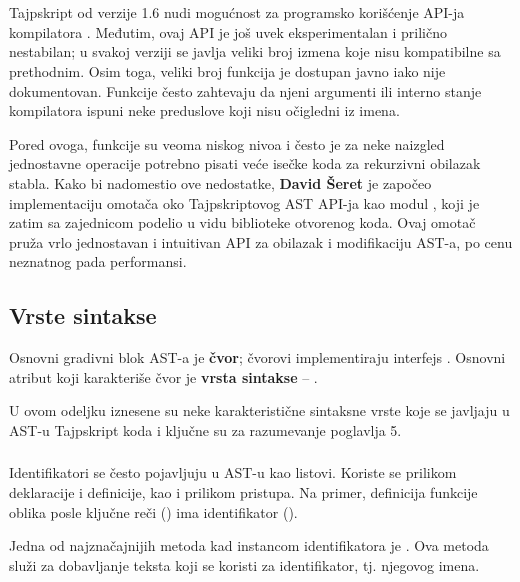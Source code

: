 \section{}
\label{sec:ts-simple-ast}

Tajpskript od verzije 1.6 nudi mogućnost za programsko korišćenje API-ja kompilatora \cite{gh:ms:ts:wiki:using-the-compiler-api}.
Međutim, ovaj API je još uvek eksperimentalan i prilično nestabilan; u svakoj verziji se javlja veliki broj izmena koje nisu kompatibilne sa prethodnim.
Osim toga, veliki broj funkcija je dostupan javno iako nije dokumentovan.
Funkcije često zahtevaju da njeni argumenti ili interno stanje kompilatora ispuni neke preduslove koji nisu očigledni iz imena.

Pored ovoga, funkcije su veoma niskog nivoa i često je za neke naizgled jednostavne operacije potrebno pisati veće isečke koda za rekurzivni obilazak stabla.
Kako bi nadomestio ove nedostatke, \textbf{David Šeret} je započeo implementaciju omotača oko Tajpskriptovog AST API-ja kao modul , koji je zatim sa zajednicom podelio u vidu biblioteke otvorenog koda.
Ovaj omotač pruža vrlo jednostavan i intuitivan API za obilazak i modifikaciju AST-a, po cenu neznatnog pada performansi.

\subsection{Vrste sintakse}

Osnovni gradivni blok AST-a je \textbf{čvor}; čvorovi implementiraju interfejs .
Osnovni atribut koji karakteriše čvor je \textbf{vrsta sintakse} -- .

U ovom odeljku iznesene su neke karakteristične sintaksne vrste koje se javljaju u AST-u Tajpskript koda i ključne su za razumevanje poglavlja 5.

\subsubsection{}
\label{ast:Identifier}

Identifikatori se često pojavljuju u AST-u kao listovi.
Koriste se prilikom deklaracije i definicije, kao i prilikom pristupa.
Na primer, definicija funkcije oblika  posle ključne reči  () ima identifikator ().

Jedna od najznačajnijih metoda kad instancom identifikatora je .
Ova metoda služi za dobavljanje teksta koji se koristi za identifikator, tj. njegovog imena.

